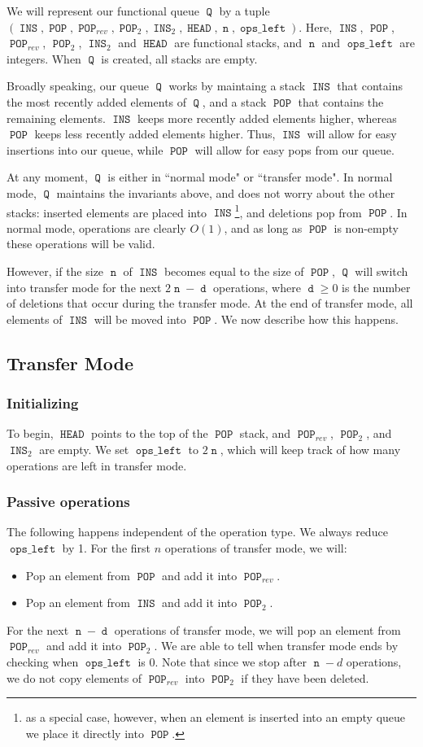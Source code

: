 \documentclass[12.5pt]{scrartcl}
\DeclareMathOperator{\INS}{\mathtt{INS}}
\DeclareMathOperator{\POP}{\mathtt{POP}}
\DeclareMathOperator{\HEAD}{\mathtt{HEAD}}
\DeclareMathOperator{\opsleft}{\mathtt{ops\_left}}
\DeclareMathOperator{\n}{\mathtt{n}}
\DeclareMathOperator{\dd}{\mathtt{d}}
\DeclareMathOperator{\Q}{\mathtt{Q}}
\begin{document}
We will represent our functional queue $\Q$ by a tuple $(\INS, \POP, \POP_{rev}, \POP_2, \INS_2,\HEAD, \n, \opsleft)$. Here, $\INS$, $\POP$, $\POP_{rev}$, $\POP_2$, $\INS_2$ and $\HEAD$ are functional stacks, and $\n$ and $\opsleft$ are integers. When $\Q$ is created, all stacks are empty. 

Broadly speaking, our queue $\Q$ works by maintaing a stack $\INS$ that contains the most recently added elements of $\Q$, and a stack $\POP$ that contains the remaining elements. $\INS$ keeps more recently added elements higher, whereas $\POP$ keeps less recently added elements higher. Thus, $\INS$ will allow for easy insertions into our queue, while $\POP$ will allow for easy pops from our queue. 

At any moment, $\Q$ is either in ``normal mode" or ``transfer mode". In normal mode, $\Q$ maintains the invariants above, and does not worry about the other stacks: inserted elements are placed into $\INS$\footnote{as a special case, however, when an element is inserted into an empty queue we place it directly into $\POP$.}, and deletions pop from $\POP$. In normal mode, operations are clearly $O(1)$, and as long as $\POP$ is non-empty these operations will be valid. 

However, if the size $\n$ of $\INS$ becomes equal to the size of $\POP$, $\Q$ will switch into transfer mode for the next $2\n - \dd$ operations, where $\dd \geq 0$ is the number of deletions that occur during the transfer mode. At the end of transfer mode, all elements of $\INS$ will be moved into $\POP$. We now describe how this happens. 

\subsection{Transfer Mode}

\subsubsection{Initializing} To begin, $\HEAD$ points to the top of the $\POP$ stack, and $\POP_{rev}$, $\POP_2$, and $\INS_2$ are empty. We set $\opsleft$ to $2\n$, which will keep track of how many operations are left in transfer mode.

\subsubsection{Passive operations} The following happens independent of the operation type. We always reduce $\opsleft$ by 1. For the first $n$ operations of transfer mode, we will:
\begin{itemize}
	\item Pop an element from $\POP$ and add it into $\POP_{rev}$.
	\item Pop an element from $\INS$ and add it into $\POP_2$.
\end{itemize}
For the next $\n - \dd$ operations of transfer mode, we will pop an element from $\POP_{rev}$ and add it into $\POP_2$. We are able to tell when transfer mode ends by checking when $\opsleft$ is 0. Note that since we stop after $\n-d$ operations, we do not copy elements of $\POP_{rev}$ into $\POP_2$ if they have been deleted.     
\end{document}
